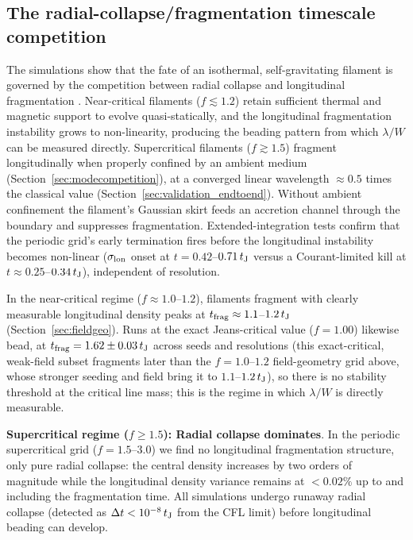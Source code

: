 \documentclass[usenatbib,twoside,twocolumn]{mnras}
\begin{document}
\subsection{The radial-collapse/fragmentation timescale competition}
\label{sec:regimes}

The simulations show that the fate of an isothermal, self-gravitating filament is governed by the competition between radial collapse and longitudinal fragmentation \citep{Inutsuka1997, Pon2012}. Near-critical filaments ($f\lesssim1.2$) retain sufficient thermal and magnetic support to evolve quasi-statically, and the longitudinal fragmentation instability grows to non-linearity, producing the beading pattern from which $\lambda/W$ can be measured directly. Supercritical filaments ($f\gtrsim1.5$) fragment longitudinally when properly confined by an ambient medium (Section~\ref{sec:modecompetition}), at a converged linear wavelength $\approx0.5$ times the classical value (Section~\ref{sec:validation_endtoend}). Without ambient confinement the filament's Gaussian skirt feeds an accretion channel through the boundary and suppresses fragmentation. Extended-integration tests confirm that the periodic grid's early termination fires before the longitudinal instability becomes non-linear ($\sigma_{\rm lon}$ onset at $t=0.42$--$0.71\,t_{\rm J}$ versus a Courant-limited kill at $t\approx0.25$--$0.34\,t_{\rm J}$), independent of resolution.

In the near-critical regime ($f\approx1.0$--$1.2$), filaments fragment with clearly measurable longitudinal density peaks at $t_{\rm frag}\approx1.1$--$1.2\,t_{\rm J}$ (Section~\ref{sec:fieldgeo}). Runs at the exact Jeans-critical value ($f=1.00$) likewise bead, at $t_{\rm frag}=1.62\pm0.03\,t_{\rm J}$ across seeds and resolutions (this exact-critical, weak-field subset fragments later than the $f=1.0$--$1.2$ field-geometry grid above, whose stronger seeding and field bring it to $1.1$--$1.2\,t_{\rm J}$), so there is no stability threshold at the critical line mass; this is the regime in which $\lambda/W$ is directly measurable.

\textbf{Supercritical regime ($f \geq 1.5$): Radial collapse dominates}. In the periodic supercritical grid ($f=1.5$--$3.0$) we find no longitudinal fragmentation structure, only pure radial collapse: the central density increases by two orders of magnitude while the longitudinal density variance remains at $<0.02\%$ up to and including the fragmentation time. All simulations undergo runaway radial collapse (detected as $\Delta t < 10^{-8}\,t_{\rm J}$ from the CFL limit) before longitudinal beading can develop.
\end{document}
